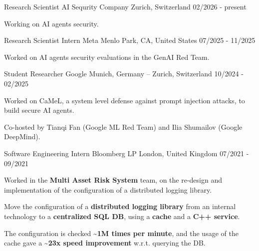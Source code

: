 

\begin{cventries}

\cventry
  {Research Scientist} %
  {AI Sequrity Company} %
  {Zurich, Switzerland} %
  {02/2026 - present} %
  {
    \begin{cvitems} %
      \item Working on AI agents security.
    \end{cvitems}
  }

\cventry
  {Research Scientist Intern} %
  {Meta} %
  {Menlo Park, CA, United States} %
  {07/2025 - 11/2025} %
  {
    \begin{cvitems} %
      \item Worked on AI agents security evaluations in the GenAI Red Team.
    \end{cvitems}
  }

\cventry
  {Student Researcher} %
  {Google} %
  {Munich, Germany -- Zurich, Switzerland} %
  {10/2024 - 02/2025} %
  {
    \begin{cvitems} %
      \item Worked on CaMeL, a system level defense against prompt injection attacks, to build secure AI agents.
      \item Co-hosted by Tianqi Fan (Google ML Red Team) and Ilia Shumailov (Google DeepMind).
    \end{cvitems}
  }
  
  \cventry
  {Software Engineering Intern} %
  {Bloomberg LP} %
  {London, United Kingdom} %
  {07/2021 - 09/2021} %
  {
    \begin{cvitems} %
      \item Worked in the \textbf{Multi Asset Risk System} team, on the re-design and implementation of the configuration of a distributed logging library.
      \item Move the configuration of a \textbf{distributed logging library} from an internal technology to a \textbf{centralized SQL DB}, using a \textbf{cache} and a \textbf{C++ service}.
      \item The configuration is checked \textbf{\textasciitilde 1M times per minute}, and the usage of the cache gave a \textbf{\textasciitilde 23x speed improvement} w.r.t. querying the DB.
    \end{cvitems}
  }


\end{cventries}
